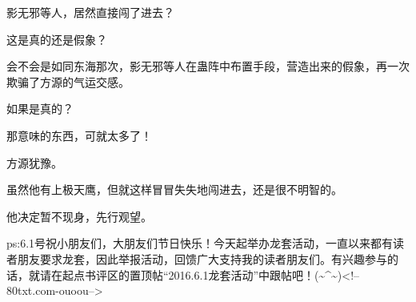 \begin{this_body}
影无邪等人，居然直接闯了进去？

这是真的还是假象？

会不会是如同东海那次，影无邪等人在蛊阵中布置手段，营造出来的假象，再一次欺骗了方源的气运交感。

如果是真的？

那意味的东西，可就太多了！

方源犹豫。

虽然他有上极天鹰，但就这样冒冒失失地闯进去，还是很不明智的。

他决定暂不现身，先行观望。

ps:6.1号祝小朋友们，大朋友们节日快乐！今天起举办龙套活动，一直以来都有读者朋友要求龙套，因此举报活动，回馈广大支持我的读者朋友们。有兴趣参与的话，就请在起点书评区的置顶帖“2016.6.1龙套活动”中跟帖吧！(\~{}\^{}\~{})<!--80txt.com-ouoou-->

\end{this_body}

